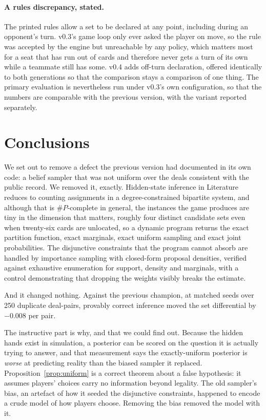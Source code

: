 \documentclass[11pt,letterpaper]{article}
\begin{document}
\paragraph{A rules discrepancy, stated.} The printed rules allow a set to be
declared at any point, including during an opponent's turn. v0.3's game loop
only ever asked the player on move, so the rule was accepted by the engine but
unreachable by any policy, which matters most for a seat that has run out of
cards and therefore never gets a turn of its own while a teammate still has
some. v0.4 adds off-turn declaration, offered identically to both generations
so that the comparison stays a comparison of one thing. The primary evaluation
is nevertheless run under v0.3's own configuration, so that the numbers are
comparable with the previous version, with the variant reported separately.

\section{Conclusions}
\label{sec:conclusions}

We set out to remove a defect the previous version had documented in its own
code: a belief sampler that was not uniform over the deals consistent with the
public record. We removed it, exactly. Hidden-state inference in Literature
reduces to counting assignments in a degree-constrained bipartite system, and
although that is $\#P$-complete in general, the instances the game produces are
tiny in the dimension that matters, roughly four distinct candidate sets even
when twenty-six cards are unlocated, so a dynamic program returns the exact
partition function, exact marginals, exact uniform sampling and exact joint
probabilities. The disjunctive constraints that the program cannot absorb are
handled by importance sampling with closed-form proposal densities, verified
against exhaustive enumeration for support, density and marginals, with a
control demonstrating that dropping the weights visibly breaks the estimate.

And it changed nothing. Against the previous champion, at matched seeds over 250
duplicate deal-pairs, provably correct inference moved the set differential by
$-0.008$ per pair.

The instructive part is why, and that we could find out. Because the hidden
hands exist in simulation, a posterior can be scored on the question it is
actually trying to answer, and that measurement says the exactly-uniform
posterior is \emph{worse} at predicting reality than the biased sampler it
replaced. Proposition~\ref{prop:uniform} is a correct theorem about a false
hypothesis: it assumes players' choices carry no information beyond legality.
The old sampler's bias, an artefact of how it seeded the disjunctive
constraints, happened to encode a crude model of how players choose. Removing
the bias removed the model with it.
\end{document}
